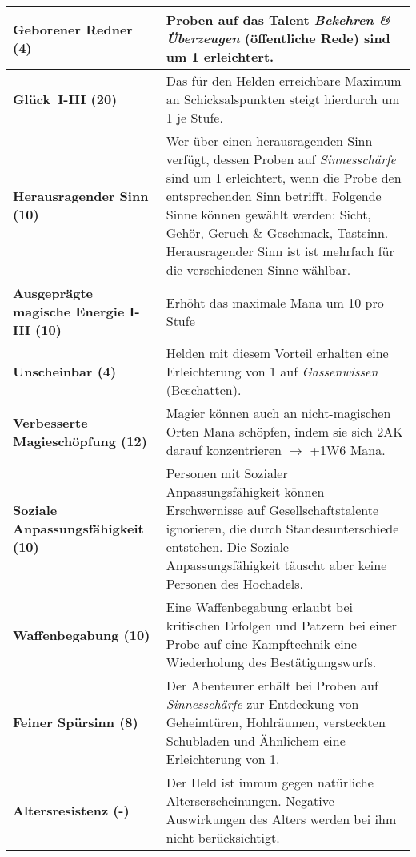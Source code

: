 \begin{longtable}{|p{5cm}|p{11cm}|}
\textbf{Geborener Redner (4)} & Proben auf das Talent \textit{Bekehren \& Überzeugen} (öffentliche Rede) sind um 1 erleichtert. \\ \hline

\textbf{Glück~I-III (20)} & Das für den Helden erreichbare Maximum an Schicksalspunkten steigt hierdurch um 1 je Stufe. \\ \hline

\textbf{Herausragender Sinn (10)} & Wer über einen herausragenden Sinn verfügt, dessen Proben auf \textit{Sinnesschärfe} sind um 1 erleichtert, wenn die Probe den entsprechenden Sinn betrifft. Folgende Sinne können gewählt werden: Sicht, Gehör, Geruch \& Geschmack, Tastsinn. Herausragender Sinn ist ist mehrfach für die verschiedenen Sinne wählbar. \\ \hline

\textbf{Ausgeprägte magische Energie I-III (10)} & Erhöht das maximale Mana um 10 pro Stufe \\ \hline

\textbf{Unscheinbar (4)} & Helden mit diesem Vorteil erhalten eine Erleichterung von 1 auf \textit{Gassenwissen} (Beschatten). \\ \hline

\textbf{Verbesserte Magieschöpfung (12)} & Magier können auch an nicht-magischen Orten Mana schöpfen, indem sie sich 2AK darauf konzentrieren $\rightarrow$ +1W6 Mana. \\ \hline

\textbf{Soziale Anpassungsfähigkeit (10)} & Personen mit Sozialer Anpassungsfähigkeit können Erschwernisse auf Gesellschaftstalente ignorieren, die durch Standesunterschiede entstehen. Die Soziale Anpassungsfähigkeit täuscht aber keine Personen des Hochadels. \\ \hline

\textbf{Waffenbegabung (10)} & Eine Waffenbegabung erlaubt bei kritischen Erfolgen und Patzern bei einer Probe auf eine Kampftechnik eine Wiederholung des Bestätigungswurfs. \\ \hline

\textbf{Feiner Spürsinn (8)} & Der Abenteurer erhält bei Proben auf \textit{Sinnesschärfe} zur Entdeckung von Geheimtüren, Hohlräumen, versteckten Schubladen und Ähnlichem eine Erleichterung von 1. \\ \hline

\textbf{Altersresistenz (-)\footnotemark[1]} & Der Held ist immun gegen natürliche Alterserscheinungen. Negative Auswirkungen des Alters werden bei ihm nicht berücksichtigt. \\ \hline


\end{longtable}
